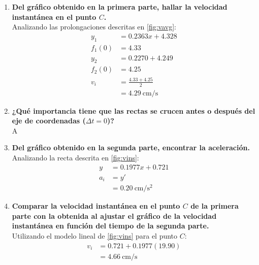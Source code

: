 \documentclass[../main]{subfiles}
\begin{document}
\begin{enumerate}
  \item \textbf{Del gráfico obtenido en la primera parte, hallar la velocidad instantánea en el punto $C$.}\\
    Analizando las prolongaciones descritas en \ref{fig:vavg}:
    \begin{align*}
      y_1 &= 0.2363x + 4.328\\
      f_1(0) &= 4.33\\
      y_2 &= 0.2270 + 4.249\\
      f_2(0) &= 4.25\\
      v_i &= \frac{4.33 + 4.25}{2}\\
          &= \qty{4.29}{\cm\per\s}
    \end{align*}
  \item \textbf{¿Qué importancia tiene que las rectas se crucen antes o después del eje de
coordenadas ($\Delta t = 0$)?}\\
    A
  \item \textbf{Del gráfico obtenido en la segunda parte, encontrar la aceleración.}\\
    Analizando la recta descrita en \ref{fig:vins}:
    \begin{align*}
      y &= 0.1977x + 0.721\\
      a_i &= y'\\
          &= \qty{0.20}{\cm\per\second\squared}
    \end{align*}
  \item \textbf{Comparar la velocidad instantánea en el punto $C$ de la primera parte con la obtenida al ajustar el gráfico de la velocidad instantánea en función del tiempo de la segunda parte.}\\
    Utilizando el modelo lineal de \ref{fig:vins} para el punto $C$:
\begin{align*}
  v_i &= 0.721 + 0.1977(19.90)\\
      &= \qty{4.66}{\cm\per\s}
\end{align*}
\end{enumerate}
\end{document}
